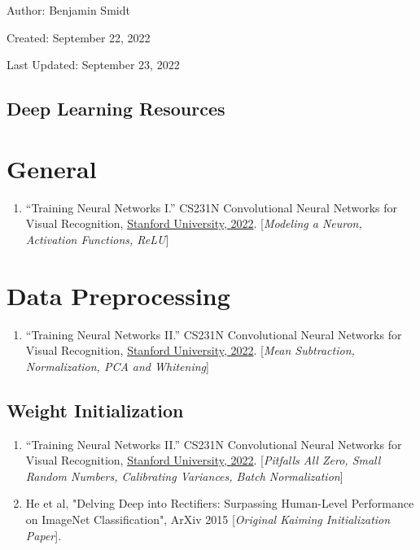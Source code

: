\documentclass[12pt]{article}
\begin{document}
\noindent Author: Benjamin Smidt

\noindent Created: September 22, 2022

\noindent Last Updated: September 23, 2022
\begin{center}
\section*{Deep Learning Resources}
\end{center}

\tableofcontents{}

\newpage

\section{General}
\begin{enumerate}
    \item “Training Neural Networks I.” 
    CS231N Convolutional Neural Networks for Visual Recognition, 
    \href{https://cs231n.github.io/neural-networks-1/#intro}{Stanford University, 2022}.
    [\emph{Modeling a Neuron, Activation Functions, ReLU}]
\end{enumerate}

\section{Data Preprocessing}
\begin{enumerate}
    \item “Training Neural Networks II.” 
    CS231N Convolutional Neural Networks for Visual Recognition, 
    \href{https://cs231n.github.io/neural-networks-2/#datapre}{Stanford University, 2022}. 
    [\emph{Mean Subtraction, Normalization, PCA and Whitening}]
\end{enumerate}

\subsection{Weight Initialization}
\begin{enumerate}
    \item “Training Neural Networks II.” 
    CS231N Convolutional Neural Networks for Visual Recognition, 
    \href{https://cs231n.github.io/neural-networks-2/#init}{Stanford University, 2022}. 
    [\emph{Pitfalls All Zero, Small Random Numbers, Calibrating Variances, 
    Batch Normalization}]
    \item He et al, "Delving Deep into Rectifiers: Surpassing Human-Level 
    Performance on ImageNet Classification", ArXiv 2015 [\emph{Original Kaiming Initialization Paper}]. 
\end{enumerate}
\end{document}
